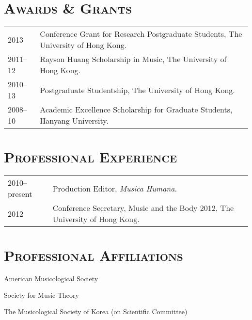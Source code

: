 \documentclass[letter,11pt]{article}
\begin{document}
  \section*{\textsc{Awards \& Grants}}
  
  \hspace*{-0.25cm}
  \begin{tabular}{p{2.5cm} l}
    2013 & Conference Grant for Research Postgraduate Students, The University of Hong Kong.\\
    2011–12 & Rayson Huang Scholarship in Music, The University of Hong Kong.\\
    2010–13 & Postgraduate Studentship, The University of Hong Kong.\\
    2008–10 & Academic Excellence Scholarship for Graduate Students, Hanyang University.
  \end{tabular}
  
  \vspace{2.5mm}
  
  \section*{\textsc{Professional Experience}}
  
  \hspace*{-0.25cm}
  \begin{tabular}{p{2.5cm} l}
    2010--present & Production Editor, \textit{Musica Humana}.\\
    2012 & Conference Secretary, Music and the Body 2012, The University of Hong Kong.
  \end{tabular}
  
  \vspace{2.5mm}
  
  \section*{\textsc{Professional Affiliations}}
  
  American Musicological Society
  
  \noindent Society for Music Theory
  
  \noindent The Musicological Society of Korea (on Scientific Committee)
  
\end{document}

